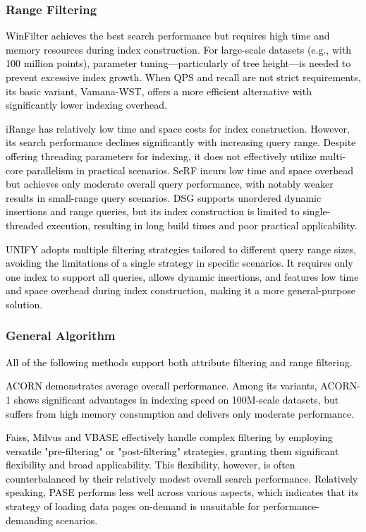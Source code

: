 \documentclass[sigconf, nonacm, pdfa]{acmart}
\begin{document}
{	\subsubsection{Range Filtering}
\textcolor{black}{
	WinFilter achieves the best search performance but requires high time and memory resources during index construction. For large-scale datasets (e.g., with 100 million points), parameter tuning—particularly of tree height—is needed to prevent excessive index growth. When QPS and recall are not strict requirements, its basic variant, Vamana-WST, offers a more efficient alternative with significantly lower indexing overhead.
		}
	
	\textcolor{black}{
	iRange has relatively low time and space costs for index construction. However, its search performance declines significantly with increasing query range. Despite offering threading parameters for indexing, it does not effectively utilize multi-core parallelism in practical scenarios.
	SeRF incurs low time and space overhead but achieves only moderate overall query performance, with notably weaker results in small-range query scenarios.
	DSG supports unordered dynamic insertions and range queries, but its index construction is limited to single-threaded execution, resulting in long build times and poor practical applicability.}
	
		\textcolor{black}{
	UNIFY adopts multiple filtering strategies tailored to different query range sizes, avoiding the limitations of a single strategy in specific scenarios. It requires only one index to support all queries, allows dynamic insertions, and features low time and space overhead during index construction, making it a more general-purpose solution.}


	\subsubsection{General Algorithm}
\textcolor{black}{All of the following methods support both attribute filtering and range filtering.}

\textcolor{black}{
ACORN demonstrates average overall performance. Among its variants, ACORN-1 shows significant advantages in indexing speed on 100M-scale datasets, but suffers from high memory consumption and delivers only moderate performance.}

\textcolor{black}{
Faiss, Milvus and VBASE effectively handle complex filtering by employing versatile "pre-filtering" or "post-filtering" strategies, granting them significant flexibility and broad applicability. This flexibility, however, is often counterbalanced by their relatively modest overall search performance. Relatively speaking, PASE performs less well across various aspects, which indicates that its strategy of loading data pages on-demand is unsuitable for performance-demanding scenarios.}
	
}
\end{document}
